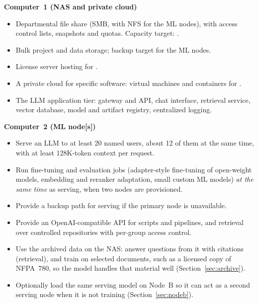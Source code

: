 

\textbf{Computer~1 (NAS and private cloud)}
\begin{itemize}
  \item Departmental file share (SMB, with NFS for the ML nodes), with access
    control lists, snapshots and quotas. Capacity target: .
  \item Bulk project and data storage; backup target for the ML nodes.
  \item License server hosting for .
  \item A private cloud for specific software: virtual machines and containers
    for .
  \item The LLM application tier: gateway and API, chat interface, retrieval
    service, vector database, model and artifact registry, centralized logging.
\end{itemize}

\textbf{Computer~2 (ML node[s])}
\begin{itemize}
  \item Serve an LLM to at least 20 named users, about 12 of them at the same
    time, with at least 128K-token context per request.
  \item Run fine-tuning and evaluation jobs (adapter-style fine-tuning of
    open-weight models, embedding and reranker adaptation, small custom ML
    models) \emph{at the same time} as serving, when two nodes are provisioned.
  \item Provide a backup path for serving if the primary node is unavailable.
  \item Provide an OpenAI-compatible API for scripts and pipelines, and
    retrieval over controlled repositories with per-group access control.
  \item Use the archived data on the NAS: answer questions from it with citations
    (retrieval), and train on selected documents, such as a licensed copy of NFPA~780,
    so the model handles that material well (Section~\ref{sec:archive}).
  \item Optionally load the same serving model on Node~B so it can act as a second
    serving node when it is not training (Section~\ref{sec:nodeb}).
\end{itemize}

